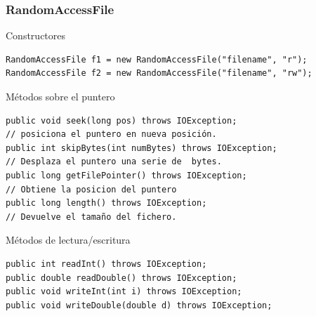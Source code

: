 \documentclass{beamer}
\begin{document}
\begin{frame}[fragile]
\frametitle{RandomAccessFile}
\begin{tiny}
\begin{block}{Constructores}
\begin{verbatim}
RandomAccessFile f1 = new RandomAccessFile("filename", "r");
RandomAccessFile f2 = new RandomAccessFile("filename", "rw");
\end{verbatim}
\end{block}
\pause
\begin{block}{Métodos sobre el puntero}
\begin{verbatim}
public void seek(long pos) throws IOException;
// posiciona el puntero en nueva posición.
public int skipBytes(int numBytes) throws IOException;
// Desplaza el puntero una serie de  bytes.
public long getFilePointer() throws IOException;
// Obtiene la posicion del puntero
public long length() throws IOException;
// Devuelve el tamaño del fichero.
\end{verbatim}
\end{block}
\pause
\begin{block}{Métodos de lectura/escritura}
\begin{verbatim}
public int readInt() throws IOException;
public double readDouble() throws IOException;
public void writeInt(int i) throws IOException;
public void writeDouble(double d) throws IOException;
\end{verbatim}
\end{block}
\end{tiny}
\end{frame}
\end{document}
